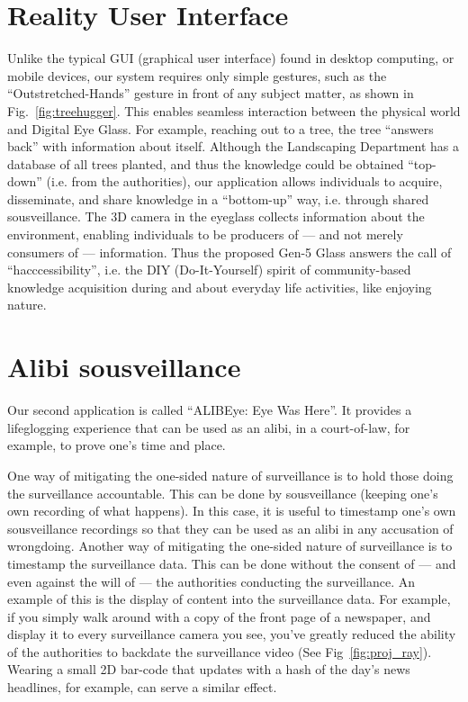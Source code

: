 \section{Reality User Interface}
Unlike the typical GUI (graphical user interface) found in desktop computing,
or mobile devices, our system requires only simple gestures, such as the
``Outstretched-Hands'' gesture in front of any subject matter,
as shown in Fig.~\ref{fig:treehugger}.
This enables seamless interaction between the physical world and
Digital Eye Glass.
For example, reaching out to a tree, the tree ``answers back'' with
information about itself.  Although the Landscaping Department has a
database of all trees planted, and thus the knowledge could be obtained
``top-down'' (i.e. from the authorities), our application allows individuals
to acquire, disseminate, and share knowledge in a ``bottom-up'' way,
i.e. through shared sousveillance.  The 3D camera in the eyeglass collects
information about the environment, enabling individuals to be producers of
--- and not merely consumers of --- information.
Thus the proposed Gen-5 Glass answers the call of ``hacccessibility'',
i.e. the DIY (Do-It-Yourself) spirit of community-based knowledge
acquisition during and about everyday life activities, like enjoying nature.


\section{Alibi sousveillance}
\label{sec:alibi}
Our second application is called ``ALIBEye: Eye Was Here''.
It provides a lifeglogging experience that can be used as an alibi,
in a court-of-law, for example, to prove one's time and place.

One way of mitigating the one-sided nature of
surveillance is to hold those doing the surveillance accountable.
This can be done by sousveillance (keeping one's own recording of what
happens).  In this case, it is useful to timestamp one's own sousveillance
recordings so that they can be used as an alibi in any accusation of wrongdoing.
Another way of mitigating the one-sided nature of surveillance is to
timestamp the surveillance data.  This can be done without the consent of ---
and even against the will of --- the authorities conducting the surveillance.
An example of this is the display of content into the surveillance data.
For example, if you simply walk around with a copy of the front page of
a newspaper, and display it to every surveillance camera you see, you've
greatly reduced the ability of the authorities to backdate the
surveillance video (See Fig~\ref{fig:proj_ray}).  Wearing a small 2D bar-code
that updates with a hash of the day's news headlines, for example, can serve
a similar effect.

